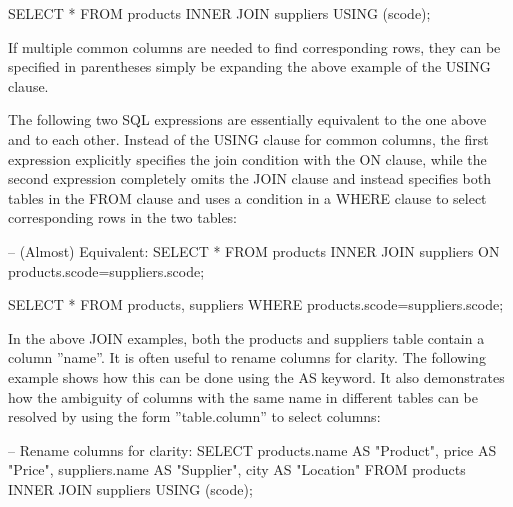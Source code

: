 \begin{sqlcode}
SELECT * FROM products INNER JOIN suppliers USING (scode);
\end{sqlcode}

If multiple common columns are needed to find corresponding rows, they can be specified in parentheses simply be expanding the above example of the USING clause.

The following two SQL expressions are essentially equivalent to the one above and to each other. Instead of the USING clause for common columns, the first expression explicitly specifies the join condition with the ON clause, while the second expression completely omits the JOIN clause and instead specifies both tables in the FROM clause and uses a condition in a WHERE clause to select corresponding rows in the two tables:

\begin{sqlcode}
-- (Almost) Equivalent:
SELECT * FROM products 
    INNER JOIN suppliers ON products.scode=suppliers.scode;

SELECT * FROM products, suppliers 
    WHERE products.scode=suppliers.scode;
\end{sqlcode}

In the above JOIN examples, both the products and suppliers table contain a column ''name''. It is often useful to rename columns for clarity. The following example shows how this can be done using the AS keyword. It also demonstrates how the ambiguity of columns with the same name in different tables can be resolved by using the form ''table.column'' to select columns:

\begin{sqlcode}
-- Rename columns for clarity:
SELECT products.name AS "Product", 
       price AS "Price", 
       suppliers.name AS "Supplier", 
       city AS "Location"
    FROM products INNER JOIN suppliers USING (scode);
\end{sqlcode}

